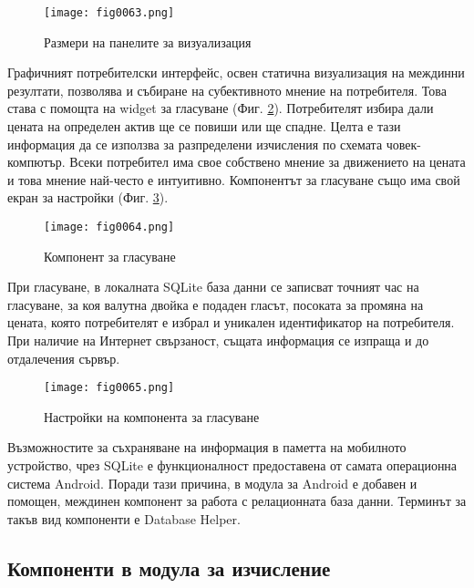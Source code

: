 \begin{figure}[H]
  \centering
  \texttt{[image: fig0063.png]}
  \caption{Размери на панелите за визуализация}
\label{fig0063}
\end{figure}

Графичният потребителски интерфейс, освен статична визуализация на междинни резултати, позволява и събиране на субективното мнение на потребителя. Това става с помощта на widget за гласуване (Фиг. \ref{fig0064}). Потребителят избира дали цената на определен актив ще се повиши или ще спадне. Целта е тази информация да се използва за разпределени изчисления по схемата човек-компютър. Всеки потребител има свое собствено мнение за движението на цената и това мнение най-често е интуитивно.  Компонентът за гласуване също има свой екран за настройки (Фиг. \ref{fig0065}).

\begin{figure}[H]
  \centering
  \texttt{[image: fig0064.png]}
  \caption{Компонент за гласуване}
\label{fig0064}
\end{figure}

При гласуване, в локалната SQLite база данни се записват точният час на гласуване, за коя валутна двойка е подаден гласът, посоката за промяна на цената, която потребителят е избрал и уникален идентификатор на потребителя. При наличие на Интернет свързаност, същата информация се изпраща и до отдалечения сървър. 

\begin{figure}[H]
  \centering
  \texttt{[image: fig0065.png]}
  \caption{Настройки на компонента за гласуване}
\label{fig0065}
\end{figure}

Възможностите за съхраняване на информация в паметта на мобилното устройство, чрез SQLite е функционалност предоставена от самата операционна система Android. Поради тази причина, в модула за Android е добавен и помощен, междинен компонент за работа с релационната база данни. Терминът за такъв вид компоненти е Database Helper.

\subsection{Компоненти в модула за изчисление}


